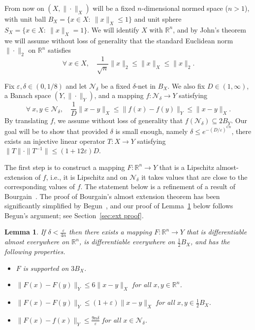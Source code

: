 \documentclass[12pt,reqno]{amsart}
\theoremstyle{plain}
\newtheorem{lemma}[theorem]{Lemma}
\theoremstyle{definition}
\newcommand{\e}{\varepsilon}
\renewcommand{\d}{\delta}
\renewcommand{\le}{\leqslant}
\newcommand{\R}{\mathbb R}
\newcommand{\n}{\mathcal N}
\begin{document}
From now on $(X,\|\cdot\|_X)$ will be a fixed $n$-dimensional normed space ($n>1$), with unit ball $B_X=\{x\in X:\ \|x\|_X\le 1\}$ and unit sphere $S_X=\{x\in X:\ \|x\|_X=1\}$. We will identify $X$ with $\R^n$, and by John's theorem~\cite{Jo} we will assume without loss of generality that the standard Euclidean norm $\|\cdot\|_2$ on $\R^n$ satisfies
\begin{equation}\label{eq:john assumption}
\forall\ x\in X,\quad \frac{1}{\sqrt{n}}\|x\|_2\le \|x\|_X\le \|x\|_2.
\end{equation}


Fix $\e,\delta\in (0,1/8)$ and let $\n_\d$ be a fixed $\d$-net in $B_X$. We also fix $D\in (1,\infty)$, a Banach space $(Y,\|\cdot\|_Y)$, and a mapping $f: \n_\d\to Y$ satisfying
\begin{equation}\label{eq:assumption on net}
\forall\ x,y\in \n_\d,\quad \frac{1}{D}\|x-y\|_X\le\|f(x)-f(y)\|_Y\le \|x-y\|_X.
\end{equation}
By translating $f$, we assume without loss of generality that $f(\n_\d)\subseteq 2B_Y$.
Our goal will be to show that provided $\d$ is small enough, namely $\delta\le e^{-(D/\e)^{Cn}}$, there exists an injective linear operator $T:X\to Y$ satisfying $\|T\|\cdot\|T^{-1}\|\le (1+12\e)D$.

The first step is to construct a mapping $F:\R^n\to Y$ that is a Lipschitz almost-extension of $f$, i.e., it is Lipschitz and on $\n_\d$ it takes values that are close to the corresponding values of $f$. The statement below is a refinement of a result of Bourgain~\cite{Bou87}. The proof of Bourgain's almost extension theorem has been significantly simplified by Begun~\cite{Beg99}, and our proof of Lemma~\ref{thm:ext1} below  follows Begun's argument; see Section~\ref{sec:ext proof}.

\begin{lemma}\label{thm:ext1} If $\delta<\frac{\e}{4n}$ then there exists a mapping $F:\R^n\to Y$ that is differentiable almost
everywhere on $\R^n$, is differentiable { everywhere} on $\frac{1}{2} B_X$,
and has the following properties.
\begin{itemize}
\item $F$ is supported on $3B_X$.
\item $\|F(x)-F(y)\|_Y\le 6\|x-y\|_X$ for all $x,y\in \R^n$.
\item $\|F(x)-F(y)\|_Y\le \left(1+\e\right)\|x-y\|_X$ for all $x,y\in \frac12 B_X$.
\item $\|F(x)-f(x)\|_Y\le \frac{9n\d}{\e}$ for all $x\in \n_\d$.
\end{itemize}
\end{lemma}
\end{document}
